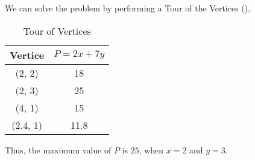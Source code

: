 \begin{subquestions}
\begin{subsubquestions}

\subsubquestion

We can solve the problem by performing a Tour of the Vertices (),

\begin{table}[H]
	\centering
	\begin{tabular}{|c|c|}
		\hline
		Vertice & $P = 2x + 7y$ \\
		\hline
		(2, 2) & 18 \\
		(2, 3) & 25 \\
		(4, 1) & 15 \\
		(2.4, 1) & 11.8 \\
		\hline
	\end{tabular}
	\caption{\label{2007:q1:tab:P} Tour of Vertices}
\end{table}

Thus, the maximum value of $P$ is $25$, when $x=2$ and $y=3$.

\end{subsubquestions}

\end{subquestions}

